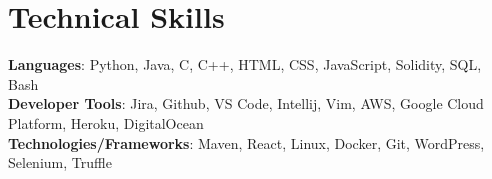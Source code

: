 \documentclass[letterpaper,11pt]{article}
\makeatletter
\newcommand{\resumeItem}[1]{
  \item\small{
    {#1 \vspace{-2pt}}
  }
}
\newcommand{\resumeSubheading}[4]{
  \vspace{-2pt}\item
    \begin{tabular*}{1.0\textwidth}[t]{l@{\extracolsep{\fill}}r}
      \textbf{#1} & \textbf{\small #2} \\
      \textit{\small#3} & \textit{\small #4} \\
    \end{tabular*}\vspace{-7pt}
}
\newcommand{\resumeSubHeadingListStart}{\begin{itemize}[leftmargin=0.0in, label={}]}
\newcommand{\resumeSubHeadingListEnd}{\end{itemize}}
\newcommand{\resumeItemListStart}{\begin{itemize}}
\newcommand{\resumeItemListEnd}{\end{itemize}\vspace{-5pt}}
\makeatother
\begin{document}
%
\section{Technical Skills}
 \begin{itemize}[leftmargin=0.15in, label={}]
    \small{\item{
     \textbf{Languages}{: Python, Java, C, C++, HTML, CSS, JavaScript, Solidity, SQL, Bash} \\
     \textbf{Developer Tools}{: Jira, Github, VS Code, Intellij, Vim, AWS, Google Cloud Platform, Heroku, DigitalOcean}\\
     \textbf{Technologies/Frameworks}{: Maven, React, Linux, Docker, Git, WordPress, Selenium, Truffle} \\
    }}
 \end{itemize}
 \vspace{-16pt}


\begin{comment}
\section{Leadership / Extracurricular}
    \resumeSubHeadingListStart
        \resumeSubheading{ColorStack}{January 2020 -- May 2022}{President - Chapter Founder}{Carnegie Mellon University}
            \resumeItemListStart
                \resumeItem{Achieved a 4 star fraternity ranking by the Office of Fraternity and Sorority Affairs (highest possible ranking).}
                \resumeItem{Managed executive board of 5 members and ran weekly meetings to oversee progress in essential parts of the chapter.}
                \resumeItem{Led chapter of 30+ members to work towards goals that improve and promote community service, academics, and unity.}
            \resumeItemListEnd

        \resumeSubheading{ColorStack}{January 2020 -- May 2022}{President - Chapter Founder}{Carnegie Mellon University}
            \resumeItemListStart
                \resumeItem{Achieved a 4 star fraternity ranking by the Office of Fraternity and Sorority Affairs (highest possible ranking).}
                \resumeItem{Managed executive board of 5 members and ran weekly meetings to oversee progress in essential parts of the chapter.}
                \resumeItem{Led chapter of 30+ members to work towards goals that improve and promote community service, academics, and unity.}
            \resumeItemListEnd
        
    \resumeSubHeadingListEnd
\end{comment}
\end{document}
